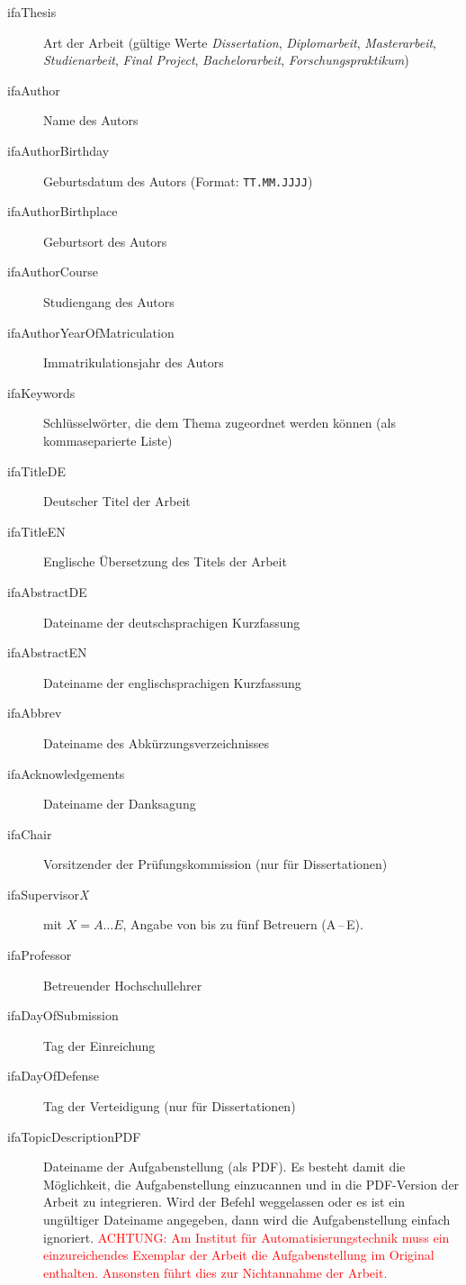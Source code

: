 \begin{description}
  \item[ifaThesis] Art der Arbeit (gültige Werte \emph{Dissertation}, \emph{Diplomarbeit}, \emph{Masterarbeit}, \emph{Studienarbeit}, \emph{Final Project}, \emph{Bachelorarbeit}, \emph{Forschungspraktikum})
  \item[ifaAuthor] Name des Autors
  \item[ifaAuthorBirthday] Geburtsdatum des Autors (Format: \verb-TT.MM.JJJJ-)
  \item[ifaAuthorBirthplace] Geburtsort des Autors
  \item[ifaAuthorCourse] Studiengang des Autors
  \item[ifaAuthorYearOfMatriculation] Immatrikulationsjahr des Autors
  \item[ifaKeywords] Schlüsselwörter, die dem Thema zugeordnet werden können (als kommaseparierte Liste)
  \item[ifaTitleDE] Deutscher Titel der Arbeit
  \item[ifaTitleEN] Englische Übersetzung des Titels der Arbeit
  \item[ifaAbstractDE] Dateiname der deutschsprachigen Kurzfassung
  \item[ifaAbstractEN] Dateiname der englischsprachigen Kurzfassung
  \item[ifaAbbrev] Dateiname des Abkürzungsverzeichnisses
  \item[ifaAcknowledgements] Dateiname der Danksagung
  \item[ifaChair] Vorsitzender der Prüfungskommission (nur für Dissertationen)
  \item[ifaSupervisor{\emph X}] mit $X=A\dots E$, Angabe von bis zu fünf Betreuern (A\,--\,E).
  \item[ifaProfessor] Betreuender Hochschullehrer
  \item[ifaDayOfSubmission] Tag der Einreichung
  \item[ifaDayOfDefense] Tag der Verteidigung (nur für Dissertationen)
  \item[ifaTopicDescriptionPDF] Dateiname der Aufgabenstellung (als PDF). Es besteht damit die Möglichkeit, die Aufgabenstellung einzucannen und in die PDF-Version der Arbeit zu integrieren. Wird der Befehl weggelassen oder es ist ein ungültiger Dateiname angegeben, dann wird die Aufgabenstellung einfach ignoriert. \textcolor{red}{ACHTUNG: Am Institut für Automatisierungstechnik muss ein einzureichendes Exemplar der Arbeit die Aufgabenstellung im Original enthalten. Ansonsten führt dies zur Nichtannahme der Arbeit.}

\end{description}
